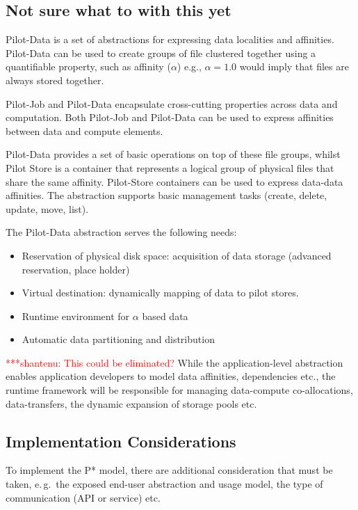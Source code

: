 \documentclass[conference,final]{IEEEtran}
\newcommand{\jhanote}[1]{ {\textcolor{red} { ***shantenu: #1 }}}
\newcommand{\jhanote}[1]{}
\begin{document}
\subsection*{Not sure what to with this yet}

Pilot-Data is a set of abstractions for expressing data localities and
affinities. Pilot-Data can be used to create groups of file clustered
together using a quantifiable property, such as affinity ($\alpha$)
e.g., $\alpha = 1.0$ would imply that files are always stored
together.

 
Pilot-Job and Pilot-Data encapsulate cross-cutting properties across data and 
computation. Both Pilot-Job and Pilot-Data can be used to express affinities 
between data and compute elements. 

Pilot-Data provides a set of basic operations on top of these file
groups, whilst Pilot Store is a container that represents a logical
group of physical files that share the same affinity. Pilot-Store
containers can be used to express data-data affinities. The
abstraction supports basic management tasks (create, delete, update,
move, list).

The Pilot-Data abstraction serves the following needs:
\begin{itemize}
\item Reservation of physical disk space: acquisition of data storage
  (advanced reservation, place holder)
\item Virtual destination: dynamically mapping of data to pilot
  stores.
\item Runtime environment for $\alpha$ based data
\item Automatic data partitioning and distribution
\end{itemize}

\jhanote{This could be eliminated?} While the application-level
abstraction enables application developers to model data affinities,
dependencies etc., the runtime framework will be responsible for
managing data-compute co-allocations, data-transfers, the dynamic
expansion of storage pools etc.

\subsection{Implementation Considerations}

To implement the P* model, there are additional consideration that
must be taken, e.\,g.\ the exposed end-user abstraction and usage
model, the type of communication (API or service) etc.
\end{document}

